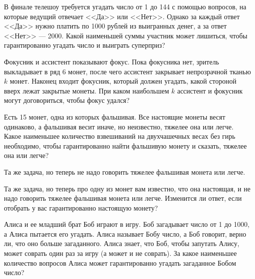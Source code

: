 \documentclass{article}
\begin{document}
\begin{enumerate_boxed}
        \item В финале телешоу требуется угадать число от 1 до 144 с помощью вопросов, на которые ведущий отвечает <<Да>> или <<Нет>>.
        Однако за каждый ответ <<Да>> нужно платить по 1000 рублей из выигранных денег, а за ответ <<Нет>> --- 2000.
        Какой наименьшей суммы участник может лишиться, чтобы гарантированно угадать число и выиграть суперприз?

        \item Фокусник и ассистент показывают фокус.
        Пока фокусника нет, зритель выкладывает в ряд 6 монет, после чего ассистент закрывает непрозрачной тканью $k$ монет.
        Наконец входит фокусник, который должен угадать, какой стороной вверх лежат закрытые монеты.
        При каком наибольшем $k$ ассистент и фокусник могут договориться, чтобы фокус удался?

        \item Есть 15 монет, одна из которых фальшивая.
        Все настоящие монеты весят одинаково, а фальшивая весит иначе, но неизвестно, тяжелее она или легче.
        Какое наименьшее количество взвешиваний на двухчашечных весах без гирь необходимо, чтобы гарантированно найти фальшивую монету и сказать, тяжелее она или легче?

        \item Та же задача, но теперь не надо говорить тяжелее фальшивая монета или легче.

        \item Та же задача, но теперь про одну из монет вам известно, что она настоящая, и не надо говорить тяжелее фальшивая монета или легче.
        Изменится ли ответ, если отобрать у вас гарантированно настоящую монету?

        \item Алиса и ее младший брат Боб играют в игру.
        Боб загадывает число от 1 до 1000, а Алиса пытается его угадать.
        Алиса называет Бобу число, а Боб говорит, верно ли, что оно больше загаданного.
        Алиса знает, что Боб, чтобы запутать Алису, может соврать один раз за игру (а может и не соврать).
        За какое наименьшее количество вопросов Алиса может гарантированно угадать загаданное Бобом число?

    \end{enumerate_boxed}
\end{document}
